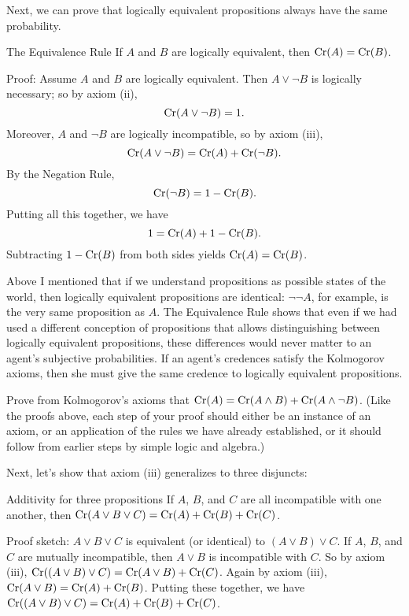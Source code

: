 Next, we can prove that logically equivalent propositions always have
the same probability.

\begin{genericthm}{The Equivalence Rule}
  If $A$ and $B$ are logically equivalent, then $\text{Cr}(A) = \text{Cr}(B)$.
\end{genericthm}
Proof: Assume $A$ and $B$ are logically equivalent. Then $A \lor \neg
B$ is logically necessary; so by axiom (ii),
\[
  \text{Cr}(A \lor \neg B) = 1.
\]
Moreover, $A$ and $\neg B$ are logically incompatible, so by axiom
(iii),
\[
  \text{Cr}(A \lor \neg B) = \text{Cr}(A) + \text{Cr}(\neg B).
\]
By the Negation Rule,
\[
  \text{Cr}(\neg B) = 1-\text{Cr}(B).
\]
Putting all this together, we have
\[
  1 = \text{Cr}(A) + 1 - \text{Cr}(B).
\]
Subtracting $1-\text{Cr}(B)$ from both sides yields $\text{Cr}(A) = \text{Cr}(B)$.

Above I mentioned that if we understand propositions as possible
states of the world, then logically equivalent propositions are
identical: $\neg\neg A$, for example, is the very same proposition as
$A$. The Equivalence Rule shows that even if we had used a different
conception of propositions that allows distinguishing between
logically equivalent propositions, these differences would never
matter to an agent's subjective probabilities. If an agent's credences
satisfy the Kolmogorov axioms, then she must give the same credence to
logically equivalent propositions.

\begin{exercise}{3}\label{exerc:partition}
  Prove from Kolmogorov's axioms that
  $\text{Cr}(A) = \text{Cr}(A\land B) + \text{Cr}(A \land \neg B)$. (Like the proofs
  above, each step of your proof should either be an instance of an
  axiom, or an application of the rules we have already established,
  or it should follow from earlier steps by simple logic and algebra.)
\end{exercise}

Next, let's show that axiom (iii) generalizes to three disjuncts:

\begin{genericthm}{Additivity for three propositions}
  If $A$, $B$, and $C$ are all incompatible with one another, then
  $\text{Cr}(A \lor B \lor C) = \text{Cr}(A) + \text{Cr}(B) + \text{Cr}(C)$.
\end{genericthm}
Proof sketch: $A \lor B \lor C$ is equivalent (or identical) to
$(A \lor B) \lor C$. If $A$, $B$, and $C$ are mutually incompatible,
then $A \lor B$ is incompatible with $C$. So by axiom (iii),
$\text{Cr}((A \lor B) \lor C) = \text{Cr}(A \lor B) + \text{Cr}(C)$. Again by axiom
(iii), $\text{Cr}(A \lor B) = \text{Cr}(A) + \text{Cr}(B)$. Putting these together, we
have $\text{Cr}((A \lor B) \lor C) = \text{Cr}(A) + \text{Cr}(B) + \text{Cr}(C)$.

